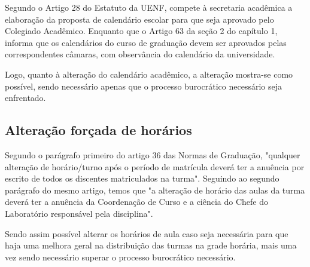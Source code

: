 
        Segundo o Artigo 28 do Estatuto da UENF, compete à secretaria acadêmica a elaboração da proposta de calendário escolar para que seja aprovado pelo Colegiado Acadêmico. Enquanto que o Artigo 63 da seção 2 do capítulo 1, informa que os calendários do curso de graduação devem ser aprovados pelas correspondentes câmaras, com observância do calendário da universidade.

        Logo, quanto à alteração do calendário acadêmico, a alteração mostra-se como possível, sendo necessário apenas que o processo burocrático necessário seja enfrentado.

    \subsection{Alteração forçada de horários} %

        Segundo o parágrafo primeiro do artigo 36 das Normas de Graduação, "qualquer alteração de horário/turno após o período de matrícula deverá ter a anuência por escrito de todos os discentes matriculados na turma". Seguindo ao segundo parágrafo do mesmo artigo, temos que "a alteração de horário das aulas da turma deverá ter a anuência da Coordenação de Curso e a ciência do Chefe do Laboratório responsável pela disciplina".

        Sendo assim possível alterar os horários de aula caso seja necessária para que haja uma melhora geral na distribuição das turmas na grade horária, mais uma vez sendo necessário superar o processo burocrático necessário.
